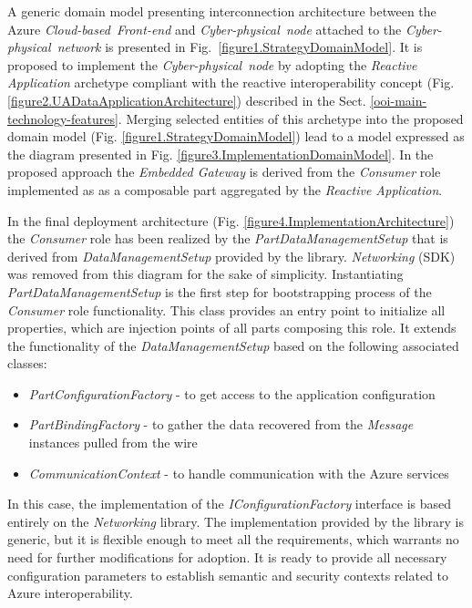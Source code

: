 \documentclass[runningheads]{llncs}
\begin{document}
A generic domain model presenting interconnection architecture between the Azure \emph{Cloud-based\ Front-end} and \emph{Cyber-physical\ node} attached to the \emph{Cyber-physical\ network} is presented in Fig.~\ref{figure1.StrategyDomainModel}. It is proposed to implement the \emph{Cyber-physical\ node} by adopting the \emph{Reactive Application} archetype compliant with the reactive interoperability concept (Fig. \ref{figure2.UADataApplicationArchitecture}) described in the Sect. \ref{ooi-main-technology-features}. Merging selected entities of this archetype into the proposed domain model (Fig. \ref{figure1.StrategyDomainModel}) lead to a model expressed as the diagram presented in Fig. \ref{figure3.ImplementationDomainModel}. In the proposed approach the \emph{Embedded Gateway} is derived from the \emph{Consumer} role implemented as as a composable part aggregated by the \emph{Reactive Application}.


In the final deployment architecture (Fig. \ref{figure4.ImplementationArchitecture}) the \emph{Consumer} role has been realized by the \emph{PartDataManagementSetup} that is derived from \emph{DataManagementSetup} provided by the library. \emph{Networking} (SDK) was removed from this diagram for the sake of simplicity. Instantiating \emph{PartDataManagementSetup} is the first step for bootstrapping process of the \emph{Consumer} role functionality. This class provides an entry point to initialize all properties, which are injection points of all parts composing this role. It extends the functionality of the \emph{DataManagementSetup} based on the following associated classes:

\begin{itemize}
      \item \emph{PartConfigurationFactory} - to get access to the application configuration
      \item \emph{PartBindingFactory} - to gather the data recovered from the \emph{Message} instances pulled from the wire
      \item \emph{CommunicationContext} - to handle communication with the Azure services
\end{itemize}

In this case, the implementation of the \emph{IConfigurationFactory} interface is based entirely on the \emph{Networking} library. The implementation provided by the library is generic, but it is flexible enough to meet all the requirements, which warrants no need for further modifications for adoption. It is ready to provide all necessary configuration parameters to establish semantic and security contexts related to Azure interoperability.
\end{document}
